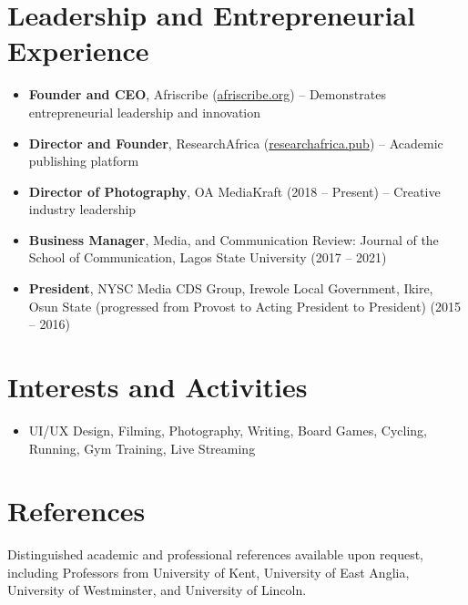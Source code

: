 \documentclass[a4paper,11pt]{article}
\newcommand{\resumeItem}[1]{
  \item\small{
    {#1 \vspace{-2pt}}
  }
}
\newcommand{\resumeItemListStart}{\begin{itemize}}
\newcommand{\resumeItemListEnd}{\end{itemize}\vspace{-5pt}}
\begin{document}
\section{Leadership and Entrepreneurial Experience}
    \resumeItemListStart
        \resumeItem{\textbf{Founder and CEO}, Afriscribe (\href{https://afriscribe.org}{afriscribe.org}) -- Demonstrates entrepreneurial leadership and innovation}
        \resumeItem{\textbf{Director and Founder}, ResearchAfrica (\href{https://researchafrica.pub}{researchafrica.pub}) -- Academic publishing platform}
        \resumeItem{\textbf{Director of Photography}, OA MediaKraft (2018 -- Present) -- Creative industry leadership}
        \resumeItem{\textbf{Business Manager}, Media, and Communication Review: Journal of the School of Communication, Lagos State University (2017 -- 2021)}
        \resumeItem{\textbf{President}, NYSC Media CDS Group, Irewole Local Government, Ikire, Osun State (progressed from Provost to Acting President to President) (2015 -- 2016)}
    \resumeItemListEnd

\section{Interests and Activities}
    \resumeItemListStart
        \resumeItem{UI/UX Design, Filming, Photography, Writing, Board Games, Cycling, Running, Gym Training, Live Streaming}
    \resumeItemListEnd

\section{References}
\small{Distinguished academic and professional references available upon request, including Professors from University of Kent, University of East Anglia, University of Westminster, and University of Lincoln.}
\end{document}
